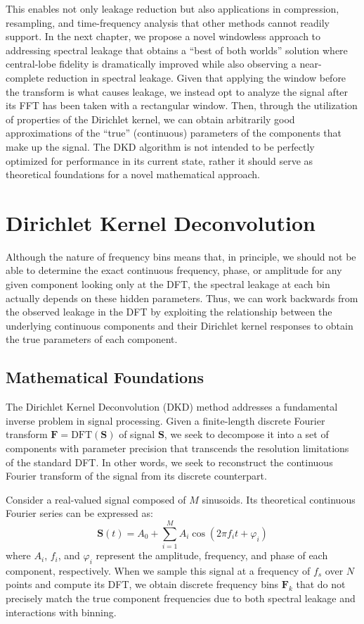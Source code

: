 \documentclass[11pt,twoside]{report}
\numberwithin{thm}{section}
\numberwithin{equation}{section}
\begin{document}
This enables not only leakage reduction but also applications in compression, resampling, and time-frequency analysis that other methods cannot readily support.
In the next chapter, we propose a novel windowless approach to addressing spectral leakage that obtains a ``best of both worlds'' solution where central-lobe fidelity is dramatically improved while also observing a near-complete reduction in spectral leakage. Given that applying the window before the transform is what causes leakage, we instead opt to analyze the signal after its FFT has been taken with a rectangular window. Then, through the utilization of properties of the Dirichlet kernel, we can obtain arbitrarily good approximations of the ``true'' (continuous) parameters of the components that make up the signal. The DKD algorithm is not intended to be perfectly optimized for performance in its current state, rather it should serve as theoretical foundations for a novel mathematical approach. 


\chapter{Dirichlet Kernel Deconvolution}
\label{ch:4}
Although the nature of frequency bins means that, in principle, we should not be able to determine the exact continuous frequency, phase, or amplitude for any given component looking only at the DFT, the spectral leakage at each bin actually depends on these hidden parameters. Thus, we can work backwards from the observed leakage in the DFT by exploiting the relationship between the underlying continuous components and their Dirichlet kernel responses to obtain the true parameters of each component. 

\section{Mathematical Foundations}
\label{subsec:mathematical_foundations}

The Dirichlet Kernel Deconvolution (DKD) method addresses a fundamental inverse problem in signal processing. Given a finite-length discrete Fourier transform $\mathbf{F} = \text{DFT}(\mathbf{S})$ of signal $\mathbf{S}$, we seek to decompose it into a set of components with parameter precision that transcends the resolution limitations of the standard DFT. In other words, we seek to reconstruct the continuous Fourier transform of the signal from its discrete counterpart.

Consider a real-valued signal composed of $M$ sinusoids. Its theoretical continuous Fourier series can be expressed as:
\begin{equation}
\label{eq:continuous_signal}
\mathbf{S}(t) = A_0 +\sum_{i=1}^{M} A_i \cos(2\pi f_i t + \varphi_i)
\end{equation}
where $A_i$, $f_i$, and $\varphi_i$ represent the amplitude, frequency, and phase of each component, respectively. When we sample this signal at a frequency of $f_s$ over $N$ points and compute its DFT, we obtain discrete frequency bins $\mathbf{F}_k$ that do not precisely match the true component frequencies due to both spectral leakage and interactions with binning.
\end{document}
